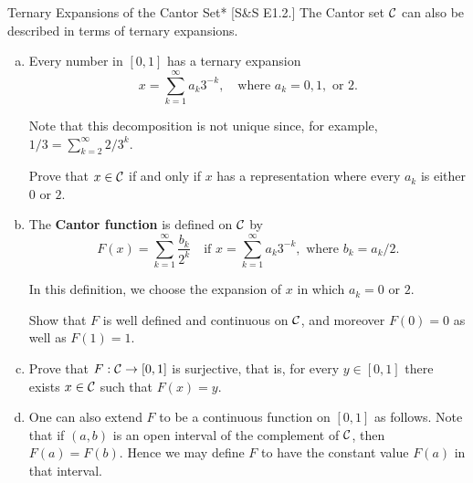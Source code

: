 \begin{problem}{Ternary Expansions of the Cantor Set}*
[S\&S E1.2.] The Cantor set $\mathcal{C}$ can also be described in terms of ternary expansions.

\begin{enumerate}[(a)]
    \item Every number in $[0,1]$ has a ternary expansion
    $$
    x = \sum_{k=1}^\infty a_k 3^{-k}, \quad \text{where } a_k = 0, 1, \text{ or } 2.
    $$

    Note that this decomposition is not unique since, for example, $1/3 = \sum_{k=2}^\infty 2/3^k$.

    Prove that $x \in \mathcal{C}$ if and only if $x$ has a representation where every $a_k$ is either $0$ or $2$.
    
    \item The \textbf{Cantor function} is defined on $\mathcal{C}$ by
    $$
    F(x) = \sum_{k=1}^\infty \frac{b_k}{2^k} \quad \text{if } x = \sum_{k=1}^\infty a_k 3^{-k}, \text{ where } b_k = a_k / 2.
    $$

    In this definition, we choose the expansion of $x$ in which $a_k = 0$ or $2$.

    Show that $F$ is well defined and continuous on $\mathcal{C}$, and moreover $F(0) = 0$ as well as $F(1) = 1$.

    \item Prove that $F : \mathcal{C} \to [0,1]$ is surjective, that is, for every $y \in [0,1]$ there exists $x \in \mathcal{C}$ such that $F(x) = y$.

    \item One can also extend $F$ to be a continuous function on $[0,1]$ as follows. Note that if $(a,b)$ is an open interval of the complement of $\mathcal{C}$, then $F(a) = F(b)$. Hence we may define $F$ to have the constant value $F(a)$ in that interval.
\end{enumerate}
\end{problem}

